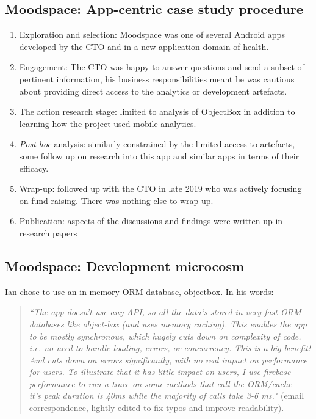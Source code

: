 \subsection{Moodspace: App-centric case study procedure}
{\small
\begin{enumerate}
    \itemsep0em
    \item Exploration and selection: Moodspace was one of several Android apps developed by the CTO and in a new application domain of health. 
    \item Engagement: The CTO was happy to answer questions and send a subset of pertinent information, his business responsibilities meant he was cautious about providing direct access to the analytics or development artefacts. 
    \item The action research stage: limited to analysis of ObjectBox in addition to learning how the project used mobile analytics.
    \item \textit{Post-hoc} analysis: similarly constrained by the limited access to artefacts, some follow up on research into this app and similar apps in terms of their efficacy.
    \item Wrap-up: followed up with the CTO in late 2019 who was actively focusing on fund-raising. There was nothing else to wrap-up.
    \item Publication: aspects of the discussions and findings were written up in research papers
\end{enumerate}
}


\subsection{Moodspace: Development microcosm}
Ian chose to use an in-memory ORM database, objectbox. In his words: 

\begin{quote}
\emph{``The app doesn't use any API, so all the data's stored in very fast ORM databases like object-box (and uses memory caching). This enables the app to be mostly synchronous, which hugely cuts down on complexity of code. i.e. no need to handle loading, errors, or concurrency. This is a big benefit! And cuts down on errors significantly, with no real impact on performance for users. To illustrate that it has little impact on users, I use firebase performance to run a trace on some methods that call the ORM/cache - it's peak duration is 40ms while the majority of calls take 3-6 ms."} (email correspondence, lightly edited to fix typos and improve readability).    
\end{quote}


